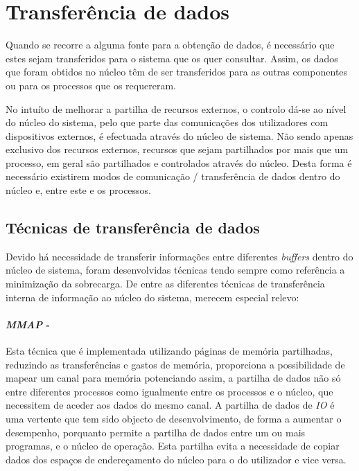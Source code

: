 \section{Transferência de dados}
\label{sect:kernel_user_comm}


Quando se recorre a alguma fonte para a obtenção de dados, é necessário que estes sejam transferidos para o sistema que os quer consultar.
Assim, os dados que foram obtidos no núcleo têm de ser transferidos para as outras componentes ou para os processos que os requereram.

No intuíto de melhorar a partilha de recursos externos, o controlo dá-se ao nível do núcleo do sistema, pelo que parte das comunicações dos utilizadores com dispositivos externos, é efectuada através do núcleo de sistema.
Não sendo apenas exclusivo dos recursos externos, recursos que sejam partilhados por mais que um processo, em geral são partilhados e controlados através do núcleo.
Desta forma é necessário existirem modos de comunicação / transferência de dados dentro do núcleo e, entre este e os processos.

\subsection{Técnicas de transferência de dados}

Devido há necessidade de transferir informações entre diferentes \textit{buffers} dentro do núcleo de sistema, foram desenvolvidas técnicas tendo sempre como referência a minimização da sobrecarga.
De entre as diferentes técnicas de transferência interna de informação ao núcleo do sistema, merecem especial relevo:

\paragraph*{\textit{MMAP} - }

Esta técnica que é implementada utilizando páginas de memória partilhadas, reduzindo as transferências e gastos de memória, proporciona a possibilidade de mapear um canal para memória potenciando assim, a partilha de dados não só entre diferentes processos como igualmente entre os processos e o núcleo, que necessitem de aceder aos dados do mesmo canal.
A partilha de dados de \textit{IO} é uma vertente que tem sido objecto de desenvolvimento, de forma a aumentar o desempenho, porquanto permite a partilha de dados entre um ou mais programas, e o núcleo de operação.
Esta partilha evita a necessidade de copiar dados dos espaços de endereçamento do núcleo para o do utilizador e vice versa.

